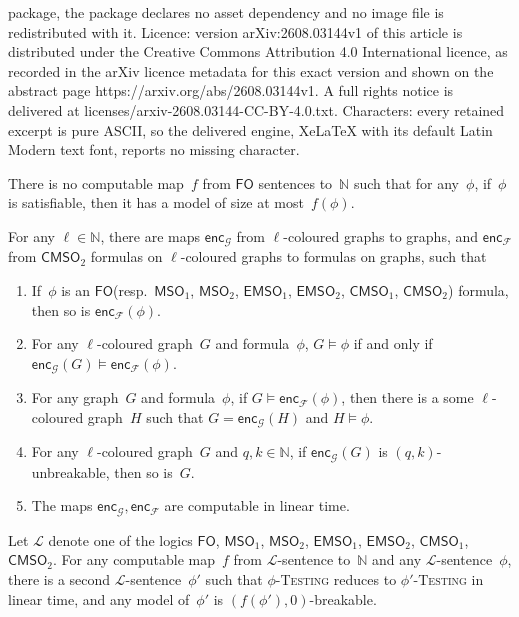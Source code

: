 \documentclass[10pt,a4paper]{amsart}
\newcommand{\Lc}{\mathcal{L}}
\newcommand{\Nn}{\mathbb{N}}
\newcommand{\cmsoE}{\ensuremath{\mathsf{CMSO}_2}\xspace}
\newcommand{\cmsoV}{\ensuremath{\mathsf{CMSO}_1}\xspace}
\newcommand{\emsoE}{\ensuremath{\mathsf{EMSO}_2}\xspace}
\newcommand{\emsoV}{\ensuremath{\mathsf{EMSO}_1}\xspace}
\newcommand{\encF}{\mathsf{enc}_{\mathcal{F}}}
\newcommand{\encG}{\mathsf{enc}_{\mathcal{G}}}
\newcommand{\fo}{\ensuremath{\mathsf{FO}}\xspace}
\newcommand{\msoE}{\ensuremath{\mathsf{MSO}_2}\xspace}
\newcommand{\msoV}{\ensuremath{\mathsf{MSO}_1}\xspace}
\newcommand{\testing}[1]{#1-\textsc{Testing}\xspace}
\begin{document}
package, the package declares no asset dependency and no image file is redistributed with it. Licence: version arXiv:2608.03144v1 of this article is distributed under the Creative Commons Attribution 4.0 International licence, as recorded in the arXiv licence metadata for this exact version and shown on the abstract page https://arxiv.org/abs/2608.03144v1. A full rights notice is delivered at licenses/arxiv-2608.03144-CC-BY-4.0.txt. Characters: every retained excerpt is pure ASCII, so the delivered engine, XeLaTeX with its default Latin Modern text font, reports no missing character.
\begin{corollary}\label{cor:model-size-uncomputable}
    There is no computable map~$f$ from \fo sentences to~$\Nn$ such that for any~$\phi$,
    if~$\phi$ is satisfiable, then it has a model of size at most~$f(\phi)$.
\end{corollary}

\begin{lemma}\label{lem:colour-encoding}
    For any $\ell \in \Nn$, there are maps $\encG$ from $\ell$-coloured graphs to graphs,
    and $\encF$ from \cmsoE formulas on $\ell$-coloured graphs to formulas on graphs, such that
    \begin{enumerate}
        \item \label{item:encode-logic} If~$\phi$ is an \fo (resp.\ \msoV, \msoE, \emsoV, \emsoE, \cmsoV, \cmsoE) formula, then so is $\encF(\phi)$.
        \item \label{item:encode-correct} For any $\ell$-coloured graph~$G$ and formula~$\phi$, $G \models \phi$ if and only if $\encG(G) \models \encF(\phi)$.
        \item \label{item:encode-complete} For any graph~$G$ and formula~$\phi$, if $G \models \encF(\phi)$, then there is a some $\ell$-coloured graph~$H$ such that $G = \encG(H)$ and $H \models \phi$.
        \item \label{item:encode-unbrk} For any $\ell$-coloured graph~$G$ and $q,k \in \Nn$, if $\encG(G)$ is $(q,k)$-unbreakable, then so is~$G$.
        \item \label{item:encode-fast} The maps $\encG,\encF$ are computable in linear time.
    \end{enumerate}
\end{lemma}

\begin{lemma}\label{lem:unbrk-trivial}
    Let $\Lc$ denote one of the logics \fo, \msoV, \msoE, \emsoV, \emsoE, \cmsoV, \cmsoE.
    For any computable map~$f$ from $\Lc$-sentence to~$\Nn$ and any $\Lc$-sentence~$\phi$, there is a second $\Lc$-sentence~$\phi'$ such that
    \testing{$\phi$} reduces to \testing{$\phi'$} in linear time, and any model of~$\phi'$ is $(f(\phi'),0)$-breakable.
\end{lemma}
\end{document}

